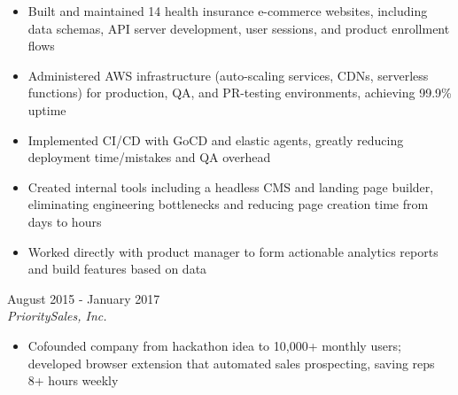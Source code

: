 \documentclass{resume}
\begin{document}
\begin{spacing}{1.2}
\begin{paracol}{2}
		\nointerlineskip
		\begin{itemize}
			\item Built and maintained 14 health insurance e-commerce websites, including data schemas, API server development, user sessions, and product enrollment flows
			\item Administered AWS infrastructure (auto-scaling services, CDNs, serverless functions) for production, QA, and PR-testing environments, achieving 99.9\% uptime
			\item Implemented CI/CD with GoCD and elastic agents, greatly reducing deployment time/mistakes and QA overhead
			\item Created internal tools including a headless CMS and landing page builder, eliminating engineering bottlenecks and reducing page creation time from days to hours
			\item Worked directly with product manager to form actionable analytics reports and build features based on data
		\end{itemize}

		\medskip

		{\large{}}
		\hfill{\color{subcontent} August 2015 - January 2017}\\
		\textit{PrioritySales, Inc.}

		\nointerlineskip
		\begin{itemize}
			\item Cofounded company from hackathon idea to 10,000+ monthly users; developed browser extension that automated sales prospecting, saving reps 8+ hours weekly
		\end{itemize}
	\end{paracol}
\end{spacing}
\end{document}
